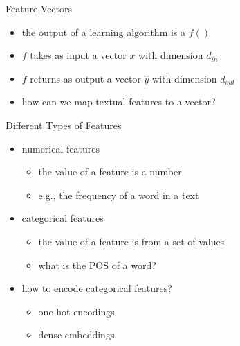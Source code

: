 \begin{frame}{Feature Vectors}
    \begin{itemize}
        \item<1-> the output of a learning algorithm is a $f()$
        \item<2-> $f$ takes as input a vector $x$ with dimension $d_{in}$
        \item<3-> $f$ returns as output a vector $\hat{y}$ with dimension $d_{out}$
        \item<4-> how can we map textual features to a vector?
    \end{itemize}
\end{frame}
\begin{frame}{Different Types of Features}
    \begin{itemize}
        \item<1-> numerical features 
        \begin{itemize}
            \item<1-> the value of a feature is a number 
            \item<2-> e.g., the frequency of a word in a text
        \end{itemize}
        \item<3-> categorical features
        \begin{itemize}
            \item<3-> the value of a feature is from a set of values
            \item<4-> what is the POS of a word? 
        \end{itemize}
        
        \item<5-> how to encode categorical features?
        \begin{itemize}
            \item<6-> one-hot encodings
            \item<7-> dense embeddings
        \end{itemize}
        
    \end{itemize}
\end{frame}
